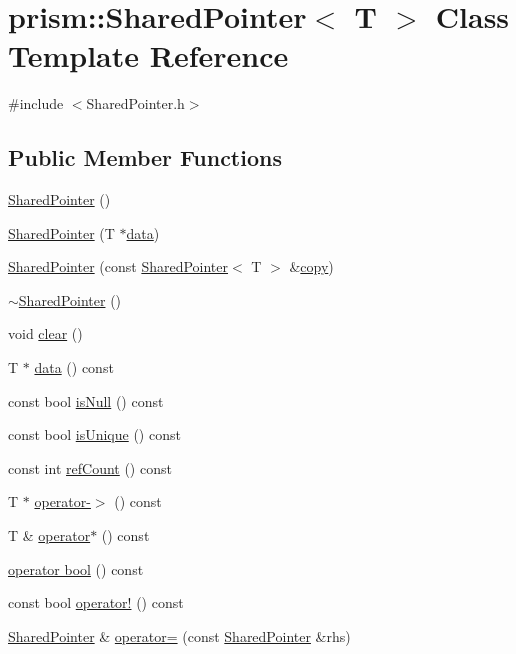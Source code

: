 \hypertarget{classprism_1_1_shared_pointer}{}\section{prism\+:\+:Shared\+Pointer$<$ T $>$ Class Template Reference}
\label{classprism_1_1_shared_pointer}


{\ttfamily \#include $<$Shared\+Pointer.\+h$>$}

\subsection*{Public Member Functions}
\begin{DoxyCompactItemize}
\item 
\hyperlink{classprism_1_1_shared_pointer_a076711618f299e5a5d04261d7d806aff}{Shared\+Pointer} ()
\item 
\hyperlink{classprism_1_1_shared_pointer_a0b8d1327178383b39bd6bb2826d384b4}{Shared\+Pointer} (T $\ast$\hyperlink{classprism_1_1_shared_pointer_aecf5f8614d4c5683e6c0207436ed8900}{data})
\item 
\hyperlink{classprism_1_1_shared_pointer_a7346c06b6c0e7c80236472c4d085460c}{Shared\+Pointer} (const \hyperlink{classprism_1_1_shared_pointer}{Shared\+Pointer}$<$ T $>$ \&\hyperlink{namespaceprism_ae776f4cd825f79e7af1cf6ee1d90a209}{copy})
\item 
\hyperlink{classprism_1_1_shared_pointer_a9892f1a766b66491af8a7356cb574ac3}{$\sim$\+Shared\+Pointer} ()
\item 
void \hyperlink{classprism_1_1_shared_pointer_a70f571a23e5c800d43f309cea9857360}{clear} ()
\item 
T $\ast$ \hyperlink{classprism_1_1_shared_pointer_aecf5f8614d4c5683e6c0207436ed8900}{data} () const 
\item 
const bool \hyperlink{classprism_1_1_shared_pointer_a011b5c5b151717cfcc45bce7eb969254}{is\+Null} () const 
\item 
const bool \hyperlink{classprism_1_1_shared_pointer_ad0eef18b3e5c37274f22cff8b88f7d66}{is\+Unique} () const 
\item 
const int \hyperlink{classprism_1_1_shared_pointer_a6b122ff924644d334ae0ff9f184af047}{ref\+Count} () const 
\item 
T $\ast$ \hyperlink{classprism_1_1_shared_pointer_a46555958394709490c4e7378c7bd2a39}{operator-\/$>$} () const 
\item 
T \& \hyperlink{classprism_1_1_shared_pointer_aef4f7418cd76f2a7b0cb20ad83e44720}{operator$\ast$} () const 
\item 
\hyperlink{classprism_1_1_shared_pointer_a1d05fe8cac7da2ea12fc321c45f59391}{operator bool} () const 
\item 
const bool \hyperlink{classprism_1_1_shared_pointer_a6a9e94b71b5ead6c0edbc836e3babb74}{operator!} () const 
\item 
\hyperlink{classprism_1_1_shared_pointer}{Shared\+Pointer} \& \hyperlink{classprism_1_1_shared_pointer_a1cc6ec5d911e2f86c2bfe07be115cd1e}{operator=} (const \hyperlink{classprism_1_1_shared_pointer}{Shared\+Pointer} \&rhs)
\end{DoxyCompactItemize}
